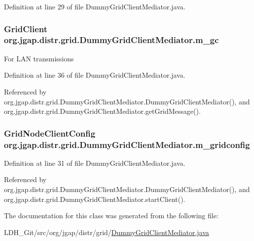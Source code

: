 Definition at line 29 of file Dummy\-Grid\-Client\-Mediator.\-java.

\hypertarget{classorg_1_1jgap_1_1distr_1_1grid_1_1_dummy_grid_client_mediator_ae5b4466541aa576166f1004920f5b29f}{
\subsubsection[{m\-\_\-gc}]{\setlength{\rightskip}{0pt plus 5cm}Grid\-Client org.\-jgap.\-distr.\-grid.\-Dummy\-Grid\-Client\-Mediator.\-m\-\_\-gc\hspace{0.3cm}{\ttfamily [private]}}}\label{classorg_1_1jgap_1_1distr_1_1grid_1_1_dummy_grid_client_mediator_ae5b4466541aa576166f1004920f5b29f}
For L\-A\-N transmissions 

Definition at line 36 of file Dummy\-Grid\-Client\-Mediator.\-java.



Referenced by org.\-jgap.\-distr.\-grid.\-Dummy\-Grid\-Client\-Mediator.\-Dummy\-Grid\-Client\-Mediator(), and org.\-jgap.\-distr.\-grid.\-Dummy\-Grid\-Client\-Mediator.\-get\-Grid\-Message().

\hypertarget{classorg_1_1jgap_1_1distr_1_1grid_1_1_dummy_grid_client_mediator_a294d251a49d05182f184199b1b5e28bd}{
\subsubsection[{m\-\_\-gridconfig}]{\setlength{\rightskip}{0pt plus 5cm}Grid\-Node\-Client\-Config org.\-jgap.\-distr.\-grid.\-Dummy\-Grid\-Client\-Mediator.\-m\-\_\-gridconfig\hspace{0.3cm}{\ttfamily [protected]}}}\label{classorg_1_1jgap_1_1distr_1_1grid_1_1_dummy_grid_client_mediator_a294d251a49d05182f184199b1b5e28bd}


Definition at line 31 of file Dummy\-Grid\-Client\-Mediator.\-java.



Referenced by org.\-jgap.\-distr.\-grid.\-Dummy\-Grid\-Client\-Mediator.\-Dummy\-Grid\-Client\-Mediator(), and org.\-jgap.\-distr.\-grid.\-Dummy\-Grid\-Client\-Mediator.\-start\-Client().



The documentation for this class was generated from the following file\-:\begin{DoxyCompactItemize}
\item 
L\-D\-H\-\_\-\-Git/src/org/jgap/distr/grid/\hyperlink{_dummy_grid_client_mediator_8java}{Dummy\-Grid\-Client\-Mediator.\-java}\end{DoxyCompactItemize}
